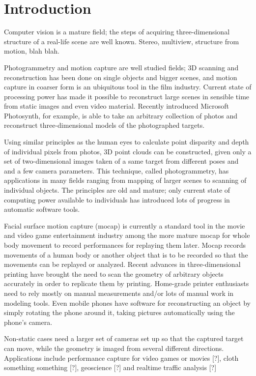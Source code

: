\section{Introduction}
\thispagestyle{empty}

Computer vision is a mature field; the steps of acquiring three-dimensional structure of a real-life scene are well known.
Stereo, multiview, structure from motion, blah blah.

Photogrammetry and motion capture are well studied fields; 3D scanning and reconstruction has been done on single objects and bigger scenes, and motion capture in coarser form is an ubiquitous tool in the film industry.
Current state of processing power has made it possible to reconstruct large scenes in sensible time from static images and even video material.
Recently introduced Microsoft Photosynth, for example, is able to take an arbitrary collection of photos and reconstruct three-dimensional models of the photographed targets.

Using similar principles as the human eyes to calculate point disparity and depth of individual pixels from photos, 3D point clouds can be constructed, given only a set of two-dimensional images taken of a same target from different poses and and a few camera parameters.
This technique, called photogrammetry, has applications in many fields ranging from mapping of larger scenes to scanning of individual objects.
The principles are old and mature; only current state of computing power available to individuals has introduced lots of progress in automatic software tools.

Facial surface motion capture (mocap) is currently a standard tool in the movie and video game entertainment industry among the more mature mocap for whole body movement to record performances for replaying them later.
Mocap records movements of a human body or another object that is to be recorded so that the movements can be replayed or analyzed.
Recent advances in three-dimensional printing have brought the need to scan the geometry of arbitrary objects accurately in order to replicate them by printing.
Home-grade printer enthusiasts need to rely mostly on manual measurements and/or lots of manual work in modeling tools.
Even mobile phones have software for reconstructing an object by simply rotating the phone around it, taking pictures automatically using the phone's camera.

Non-static cases need a larger set of cameras set up so that the captured target can move, while the geometry is imaged from several different directions. Applications include performance capture for video games or movies [?], cloth something something [?], geoscience [?] and realtime traffic analysis [?]

